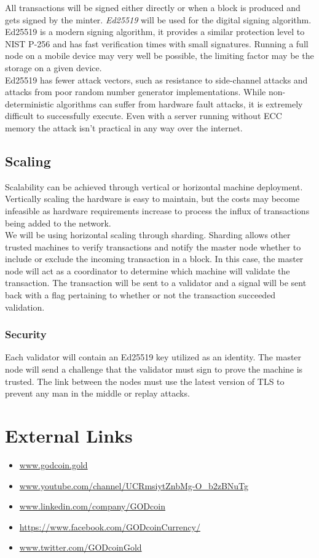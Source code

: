 \documentclass[12pt,a4paper]{article}
\begin{document}
  All transactions will be signed either directly or when a block is produced
  and gets signed by the minter. \textit{Ed25519}\cite{ed25519} will be used for
  the digital signing algorithm. Ed25519 is a modern signing algorithm, it
  provides a similar protection level to NIST P-256 and has fast verification
  times with small signatures. Running a full node on a mobile device may very
  well be possible, the limiting factor may be the storage on a given device.\\

  Ed25519 has fewer attack vectors, such as resistance to side-channel attacks
  and attacks from poor random number generator implementations. While
  non-deterministic algorithms can suffer from hardware fault attacks, it is
  extremely difficult to successfully execute. Even with a server running
  without ECC memory the attack isn't practical in any way over the
  internet.

  \subsection{Scaling}
  Scalability can be achieved through vertical or horizontal machine deployment.
  Vertically scaling the hardware is easy to maintain, but the costs may become
  infeasible as hardware requirements increase to process the influx of
  transactions being added to the network.\\

  We will be using horizontal scaling through sharding. Sharding allows other
  trusted machines to verify transactions and notify the master node whether to
  include or exclude the incoming transaction in a block. In this case, the
  master node will act as a coordinator to determine which machine will validate
  the transaction. The transaction will be sent to a validator and a signal will
  be sent back with a flag pertaining to whether or not the transaction
  succeeded validation.

  \subsubsection{Security}
  Each validator will contain an Ed25519 key utilized as an identity. The master
  node will send a challenge that the validator must sign to prove the machine
  is trusted. The link between the nodes must use the latest version of TLS to
  prevent any man in the middle or replay attacks.

  \newpage
  \section*{External Links}
  \begin{itemize}
    \item{\url{www.godcoin.gold}}
    \item{\url{www.youtube.com/channel/UCRmsiytZnbMg-O_b2zBNuTg}}
    \item{\url{www.linkedin.com/company/GODcoin}}
    \item{\url{https://www.facebook.com/GODcoinCurrency/}}
    \item{\url{www.twitter.com/GODcoinGold}}
  \end{itemize}
\end{document}
